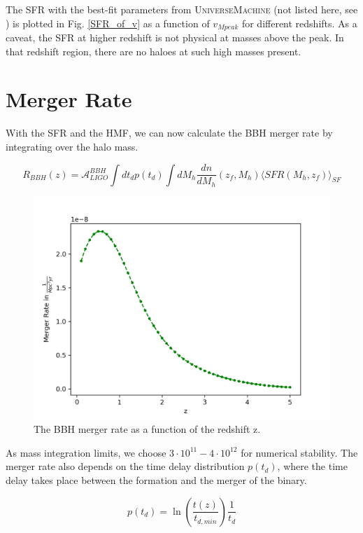 The SFR with the best-fit parameters from \textsc{UniverseMachine} (not listed here, see \cite{behroozi_universemachine_2019}) is plotted in Fig. \ref{SFR_of_v} as a function of $v_{Mpeak}$ for different redshifts. As a caveat, the SFR at higher redshift is not physical at masses above the peak. In that redshift region, there are no haloes at such high masses present.

\section{Merger Rate}
\label{merger_rate_section}

With the SFR and the HMF, we can now calculate the BBH merger rate by integrating over the halo mass.

\begin{equation}
    R_{BBH}(z)=\mathcal{A}_{LIGO}^{BBH}\int dt_d p(t_d) \int dM_h \frac{dn}{dM_h}(z_f, M_h)\langle SFR(M_h, z_f)\rangle_{SF}
    \label{BBH_merger_equation}
\end{equation}
\begin{figure}[h]
    \centering
    \includegraphics[width=0.8\linewidth]{Images/bbh_merger_rate.png}
    \caption{The BBH merger rate as a function of the redshift z.}
    \label{bbh_merger_rate}
\end{figure} 

As mass integration limits, we choose $3\cdot 10^{11} - 4\cdot 10^{12}$ for numerical stability. The merger rate also depends on the time delay distribution $p(t_d)$, where the time delay takes place between the formation and the merger of the binary. 

\begin{equation}
    p(t_d)=\ln\left(\frac{t(z)}{t_{d, min}}\right)\frac{1}{t_d}
\end{equation}

